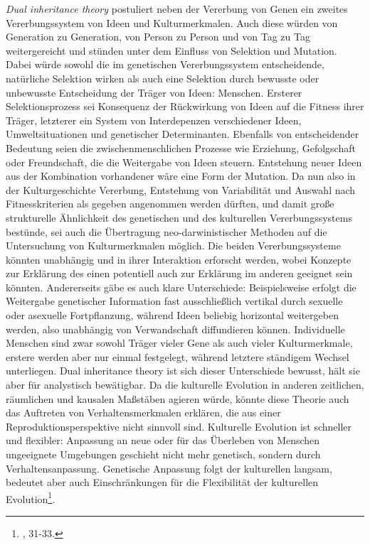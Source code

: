 \documentclass[openany,twoside,twocolumn]{book}
\let\rmarkdownfootnote\footnote%
\def\footnote{\protect\rmarkdownfootnote}
\begin{document}
\emph{Dual inheritance theory} postuliert neben der Vererbung von Genen
ein zweites Vererbungssystem von Ideen und Kulturmerkmalen. Auch diese
würden von Generation zu Generation, von Person zu Person und von Tag zu
Tag weitergereicht und stünden unter dem Einfluss von Selektion und
Mutation. Dabei würde sowohl die im genetischen Vererbungssystem
entscheidende, natürliche Selektion wirken als auch eine Selektion durch
bewusste oder unbewusste Entscheidung der Träger von Ideen: Menschen.
Ersterer Selektionsprozess sei Konsequenz der Rückwirkung von Ideen auf
die Fitness ihrer Träger, letzterer ein System von Interdepenzen
verschiedener Ideen, Umweltsituationen und genetischer Determinanten.
Ebenfalls von entscheidender Bedeutung seien die zwischenmenschlichen
Prozesse wie Erziehung, Gefolgschaft oder Freundschaft, die die
Weitergabe von Ideen steuern. Entstehung neuer Ideen aus der Kombination
vorhandener wäre eine Form der Mutation. Da nun also in der
Kulturgeschichte Vererbung, Entstehung von Variabilität und Auswahl nach
Fitnesskriterien als gegeben angenommen werden dürften, und damit große
strukturelle Ähnlichkeit des genetischen und des kulturellen
Vererbungssystems bestünde, sei auch die Übertragung neo-darwinistischer
Methoden auf die Untersuchung von Kulturmerkmalen möglich. Die beiden
Vererbungssysteme könnten unabhängig und in ihrer Interaktion erforscht
werden, wobei Konzepte zur Erklärung des einen potentiell auch zur
Erklärung im anderen geeignet sein könnten. Andererseits gäbe es auch
klare Unterschiede: Beispielsweise erfolgt die Weitergabe genetischer
Information fast ausschließlich vertikal durch sexuelle oder asexuelle
Fortpflanzung, während Ideen beliebig horizontal weitergeben werden,
also unabhängig von Verwandschaft diffundieren können. Individuelle
Menschen sind zwar sowohl Träger vieler Gene als auch vieler
Kulturmerkmale, erstere werden aber nur einmal festgelegt, während
letztere ständigem Wechsel unterliegen. Dual inheritance theory ist sich
dieser Unterschiede bewusst, hält sie aber für analystisch bewätigbar.
Da die kulturelle Evolution in anderen zeitlichen, räumlichen und
kausalen Maßstäben agieren würde, könnte diese Theorie auch das
Auftreten von Verhaltensmerkmalen erklären, die aus einer
Reproduktionsperspektive nicht sinnvoll sind. Kulturelle Evolution ist
schneller und flexibler: Anpassung an neue oder für das Überleben von
Menschen ungeeignete Umgebungen geschieht nicht mehr genetisch, sondern
durch Verhaltensanpassung. Genetische Anpassung folgt der kulturellen
langsam, bedeutet aber auch Einschränkungen für die Flexibilität der
kulturellen Evolution\footnote{\textcite{SmithThreestylesevolutionary2000},
  31-33.}.
\end{document}
